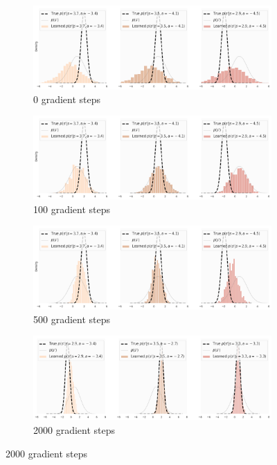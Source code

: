 \begin{figure}
\centering
\captionsetup{size=footnotesize}
\begin{subfigure}{\linewidth}
  \centering
  \includegraphics[width=1.0\linewidth]{img/trivariate/trivariate_step0}
  \caption{0 gradient steps}
\end{subfigure}
\begin{subfigure}{\textwidth}
  \centering
  \includegraphics[width=1.0\linewidth]{img/trivariate/trivariate_step100}
  \caption{100 gradient steps}
\end{subfigure}
\begin{subfigure}{\textwidth}
  \centering
  \includegraphics[width=1.0\linewidth]{img/trivariate/trivariate_step500}
  \caption{500 gradient steps}
\end{subfigure}
\begin{subfigure}{\textwidth}
  \centering
  \includegraphics[width=1.0\linewidth]{img/trivariate/trivariate_step2000}
  \caption{2000 gradient steps}
\end{subfigure}


\end{figure}
